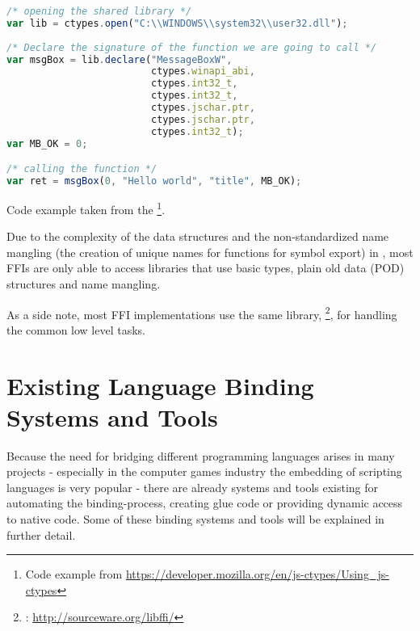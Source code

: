 \SingleSpacing
\begin{lstlisting}[language=JavaScript, caption={Exposing a \myProperName{C} function to \myProperName{JavaScript} using \myProperName{js-ctypes}}]
/* opening the shared library */
var lib = ctypes.open("C:\\WINDOWS\\system32\\user32.dll");  
  
/* Declare the signature of the function we are going to call */  
var msgBox = lib.declare("MessageBoxW",  
                         ctypes.winapi_abi,  
                         ctypes.int32_t,  
                         ctypes.int32_t,  
                         ctypes.jschar.ptr,  
                         ctypes.jschar.ptr,  
                         ctypes.int32_t);  
var MB_OK = 0;  

/* calling the function */
var ret = msgBox(0, "Hello world", "title", MB_OK); 
\end{lstlisting}
\OnehalfSpacing

Code example taken from the \footnote{Code example from \url{https://developer.mozilla.org/en/js-ctypes/Using_js-ctypes}}.

Due to the complexity of the data structures and the non-standardized name mangling (the creation of unique names for functions for symbol export) in , most FFIs are only able to access libraries that use basic  types, plain old data (POD) structures and  name mangling.

As a side note, most FFI implementations use the same library, \footnote{: \url{http://sourceware.org/libffi/}}, for handling the common low level tasks.


\section{Existing Language Binding Systems and Tools}

Because the need for bridging different programming languages arises in many projects - especially in the computer games industry the embedding of scripting languages is very popular - there are already systems and tools existing for automating the binding-process, creating glue code or providing dynamic access to native code. Some of these binding systems and tools will be explained in further detail.

